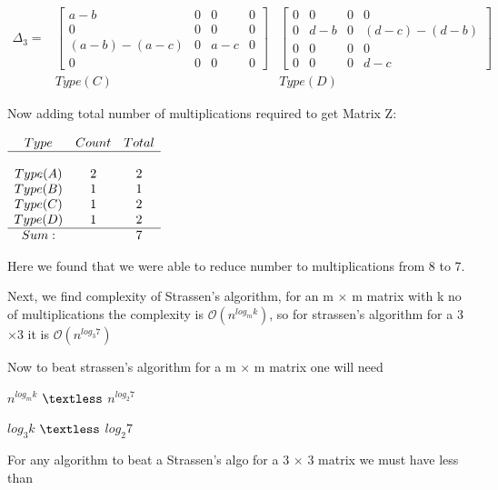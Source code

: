 \documentclass[11pt]{article}
\newcommand{\Oh}[1]{{\mathcal O}\left({#1}\right)}
\begin{document}
\begin{center}$\begin{array}{ccc}\Delta_3= &\begin{bmatrix} a-b & 0 & 0 & 0 \\0 & 0 & 0 & 0\\(a-b)-(a-c) & 0 & a-c & 0\\ 0 & 0 & 0 & 0 \end{bmatrix} & \begin{bmatrix} 0 & 0 & 0 & 0 \\ 0 & d-b & 0 &(d-c)-(d-b)\\ 0 & 0 & 0 & 0 \\ 0 & 0 & 0 & d-c\end{bmatrix}\\& Type (C) & Type(D)\end{array}$\end{center}


Now adding total number of multiplications required to get Matrix Z:
\begin{center}$\begin{array}{ccc} Type & Count & Total\\ 
\hline 
\\ Type (A) & 2 & 2 \\ Type (B) & 1 & 1 \\Type (C) & 1 & 2 \\Type (D) & 1 & 2\\
 \hline
 Sum: & & 7 \end{array}$\end{center}

Here we found that we were able to reduce number to multiplications from 8 to 7.

Next, we find complexity of Strassen's algorithm, for an m $\times$ m matrix with k no of multiplications the complexity is $\Oh{n^{log_{m}k}}$, so for strassen's algorithm for a 3$\times$3 it is $\Oh{n^{log_{3}7}}$

Now to beat strassen's algorithm for a m $\times$ m matrix one will need 

\begin{center} $n^{log_{m}k}$ $\textless$ $n^{log_{2}7}$ \end{center}

\begin{center} ${log_{3}k}$ $\textless$ ${log_{2}7}$\\ \end{center}

\begin{center} For any algorithm to beat a Strassen's algo for  a 3 $\times$ 3 matrix we must have less than \end{center}
\end{document}
